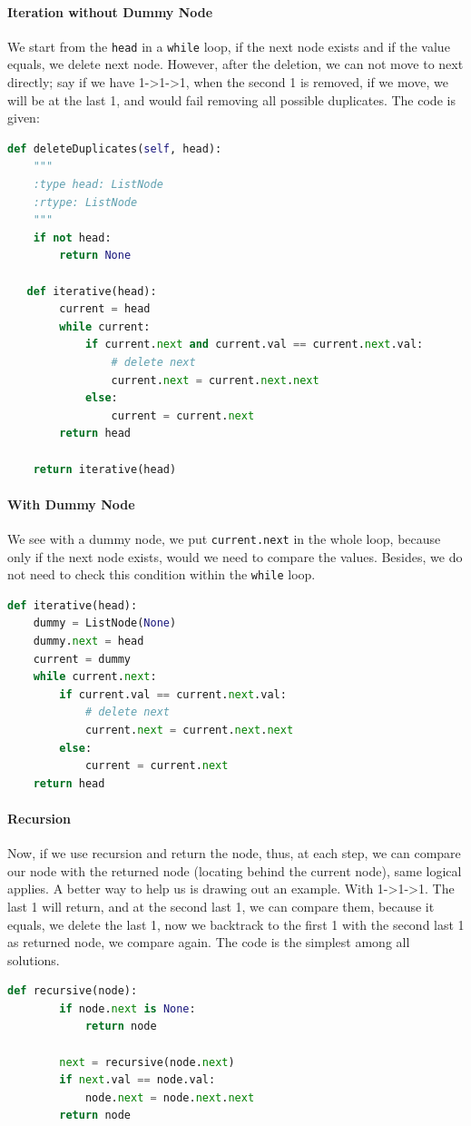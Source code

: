\documentclass[../main.tex]{subfiles}
\begin{document}
\paragraph{Iteration without Dummy Node} We start from the \texttt{head} in a \texttt{while} loop, if the next node exists and if the value equals, we delete next node. However, after the deletion, we can not move to next directly; say if we have 1->1->1, when the second 1 is removed, if we move, we will be at the last 1, and would fail removing all possible duplicates. The code is given:
\begin{lstlisting}[language=Python]
def deleteDuplicates(self, head):
    """
    :type head: ListNode
    :rtype: ListNode
    """
    if not head:
        return None
    
   def iterative(head):
        current = head
        while current:
            if current.next and current.val == current.next.val:
                # delete next
                current.next = current.next.next
            else:   
                current = current.next
        return head
    
    return iterative(head)
\end{lstlisting}
\paragraph{With Dummy Node} We see with a dummy node, we put \texttt{current.next} in the whole loop, because only if the next node exists, would we need to compare the values. Besides, we do not need to check this condition within the \texttt{while} loop. 
\begin{lstlisting}[language=Python]
def iterative(head):
    dummy = ListNode(None)
    dummy.next = head
    current = dummy
    while current.next:
        if current.val == current.next.val:
            # delete next
            current.next = current.next.next
        else:   
            current = current.next
    return head
\end{lstlisting}
\paragraph{ Recursion}Now, if we use recursion and return the node, thus, at each step, we can compare our node with the returned node (locating behind the current node), same logical applies. A better way to help us is drawing out an example. With 1->1->1. The last 1 will return, and at the second last 1, we can compare them, because it equals, we delete the last 1, now we backtrack to the first 1 with the second last 1 as returned node, we compare again. The code is the simplest among all solutions. 
\begin{lstlisting}[language=Python]
 def recursive(node):
        if node.next is None:
            return node
        
        next = recursive(node.next)
        if next.val == node.val:
            node.next = node.next.next
        return node
\end{lstlisting}
\end{document}
